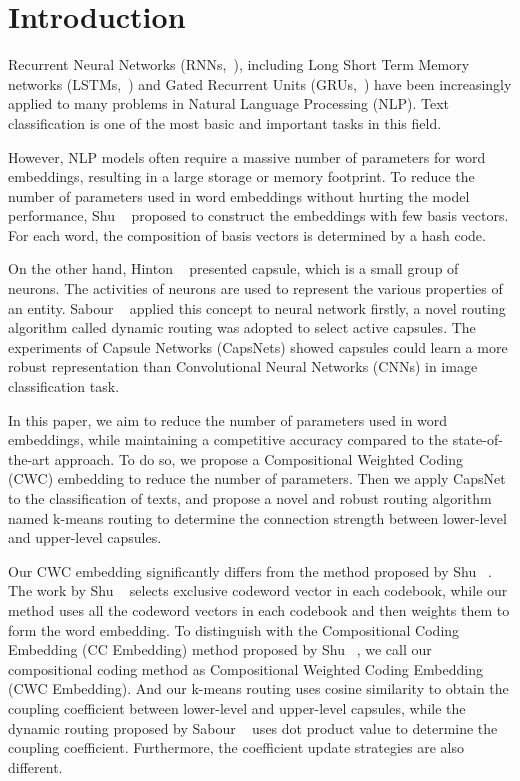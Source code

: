 \documentclass[times,twocolumn,final]{elsarticle}
\begin{document}
\section{Introduction}

Recurrent Neural Networks (RNNs,~\cite{mikolov2010recurrent, elman1990finding, rumelhart1986learning}), including Long Short Term Memory networks (LSTMs,~\cite{hochreiter1997long, gers2000learning}) and Gated Recurrent Units (GRUs,~\cite{chung2014empirical, zhou2016minimal}) have been increasingly applied to many problems in Natural Language Processing (NLP). Text classification is one of the most basic and important tasks in this field.

However, NLP models often require a massive number of parameters for word embeddings, resulting in a large storage or memory footprint. To reduce the number of parameters used in word embeddings without hurting the model performance, Shu \etal~\cite{shu2018compressing} proposed to construct the embeddings with few basis vectors. For each word, the composition of basis vectors is determined by a hash code.

On the other hand, Hinton \etal~\cite{hinton2011transforming} presented capsule, which is a small group of neurons. The activities of neurons are used to represent the various properties of an entity. Sabour \etal~\cite{sabour2017dynamic} applied this concept to neural network firstly, a novel routing algorithm called dynamic routing was adopted to select active capsules. The experiments of Capsule Networks (CapsNets) showed capsules could learn a more robust representation than Convolutional Neural Networks (CNNs) in image classification task.

In this paper, we aim to reduce the number of parameters used in word embeddings, while maintaining a competitive accuracy compared to the state-of-the-art approach. To do so, we propose a Compositional Weighted Coding (CWC) embedding to reduce the number of parameters. Then we apply CapsNet to the classification of texts, and propose a novel and robust routing algorithm named k-means routing to determine the connection strength between lower-level and upper-level capsules. 

Our CWC embedding significantly differs from the method proposed by Shu \etal~\cite{shu2018compressing}. The work by Shu \etal~\cite{shu2018compressing} selects exclusive codeword vector in each codebook, while our method uses all the codeword vectors in each codebook and then weights them to form the word embedding. To distinguish with the Compositional Coding Embedding (CC Embedding) method proposed by Shu \etal~\cite{shu2018compressing}, we call our compositional coding method as Compositional Weighted Coding Embedding (CWC Embedding). And our k-means routing uses cosine similarity to obtain the coupling coefficient between lower-level and upper-level capsules, while the dynamic routing proposed by Sabour \etal~\cite{sabour2017dynamic} uses dot product value to determine the coupling coefficient. Furthermore, the coefficient update strategies are also different.
\end{document}
